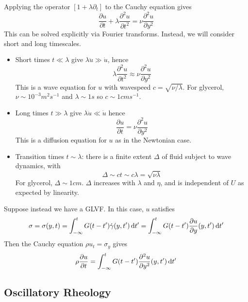 \documentclass{jknotes}
\begin{document}
Applying the operator $\left[1+\lambda \partial_t\right]$ to the Cauchy
equation gives
\begin{equation}
	\frac{\partial u}{\partial t} + \lambda \frac{\partial^2 u}{\partial t^2}
	= \nu \frac{\partial^2 u}{\partial y^2}
\end{equation}
This can be solved explicitly via Fourier transforms. Instead, we will
consider short and long timescales.
\begin{itemize}
	\item Short times $t \ll \lambda$ give $\lambda \ddot{u} \gg \dot{u}$,
		hence
		\begin{equation}
			\lambda \frac{\partial^2 u}{\partial t^2} \approx
			\nu\frac{\partial^2 u}{\partial y^2}
		\end{equation}
		This is a wave equation for $u$ with wavespeed $c =
		\sqrt{\nu/\lambda}$. For glycerol, $\nu \sim 10^{-3} m^2 s^{-1}$ and
		$\lambda \sim 1s$ so $c \sim 1cm s^{-1}$.
	\item Long times $t \gg \lambda$ give $\lambda \ddot{u} \ll \dot{u}$ hence
		\begin{equation}
			\frac{\partial u}{\partial t} = \nu \frac{\partial^2 u}{\partial
			y^2}
		\end{equation}
		This is a diffusion equation for $u$ as in the Newtonian case.
	\item Transition times $t \sim \lambda$: there is a finite extent $\Delta$
		of fluid subject to wave dynamics, with
		\begin{equation}
			\Delta \sim c t \sim c \lambda = \sqrt{\nu \lambda}
		\end{equation}
		For glycerol, $\Delta \sim 1 cm$. $\Delta$ increases with $\lambda$
		and $\eta$, and is independent of $U$ as expected by linearity.
\end{itemize}

Suppose instead we have a GLVF. In this case, $u$ satisfies
\begin{equation}
	\sigma = \sigma(y,t) = \int_{-\infty}^t G(t-t') \srate(y,t') \, \diffd t'
	= \int_{-\infty}^t G(t-t') \frac{\partial u}{\partial y}(y,t') \, \diffd t'
\end{equation}
Then the Cauchy equation $\rho u_t = \sigma_y$ gives
\begin{equation}
	\rho \frac{\partial u}{\partial t} = \int_{-\infty}^t G(t-t')
	\frac{\partial^2 u}{\partial y^2}(y,t')\,\diffd t'
\end{equation}

\subsection{Oscillatory Rheology}
\end{document}
